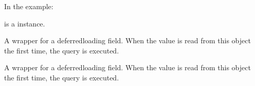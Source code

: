 \documentclass[letterpaper,10pt,french]{sphinxmanual}
\begin{document}
\begin{fulllineitems}
\begin{fulllineitems}
\sphinxAtStartPar
In the example:

\begin{sphinxVerbatim}[commandchars=\\\{\}]
 
       
\end{sphinxVerbatim}

\sphinxAtStartPar
{} is a  instance.

\end{fulllineitems}


\begin{fulllineitems}
\label{\detokenize{main/model:main.models.FicheDePaie.compte_bancaire_id}}
\pysigstartsignatures
{}
\pysigstopsignatures
\end{fulllineitems}


\begin{fulllineitems}
\label{\detokenize{main/model:main.models.FicheDePaie.dateDebut}}
\pysigstartsignatures
{}
\pysigstopsignatures
\sphinxAtStartPar
A wrapper for a deferred\sphinxhyphen{}loading field. When the value is read from this
object the first time, the query is executed.

\end{fulllineitems}


\begin{fulllineitems}
\label{\detokenize{main/model:main.models.FicheDePaie.dateFin}}
\pysigstartsignatures
{}
\pysigstopsignatures
\sphinxAtStartPar
A wrapper for a deferred\sphinxhyphen{}loading field. When the value is read from this
object the first time, the query is executed.


\end{fulllineitems}
\end{fulllineitems}
\end{document}
